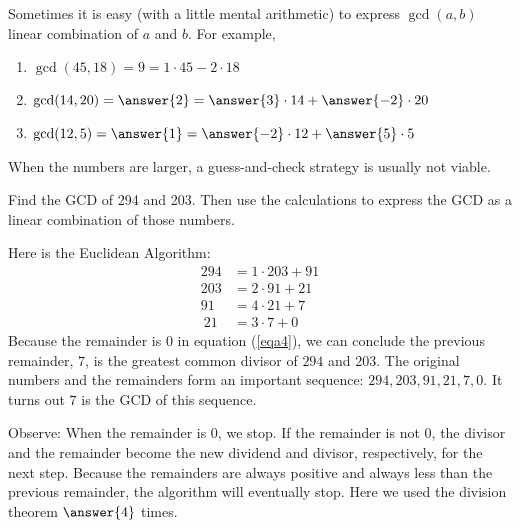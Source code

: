 \documentclass[space,nooutcomes]{ximera}
\begin{document}
\begin{problem}
Sometimes it is easy (with a little mental arithmetic) to express $\gcd(a,b)$ linear combination of $a$ and $b$.  For example, 
\begin{enumerate}
\item $\gcd(45,18) = 9 = 1\cdot 45 - 2\cdot 18$
\item $\gcd(14,20) = \answer{2} = \answer{3} \cdot 14 + \answer{-2} \cdot 20$
\item $\gcd(12,5) = \answer{1} = \answer{-2} \cdot 12 + \answer{5} \cdot 5$
\end{enumerate}
When the numbers are larger, a guess-and-check strategy is usually not viable.  
\end{problem}

\begin{example}
Find the GCD of 294 and 203.  Then use the calculations to express the GCD as a linear combination of those numbers.  

\begin{solution}
Here is the Euclidean Algorithm:  
\begin{align}
\label{eqa1} 294 & = 1\cdot 203 + 91 \\  
\label{eqa2} 203 &= 2\cdot 91 + 21 \\
\label{eqa3}  91  &= 4\cdot 21 + 7 \\\
\label{eqa4}  21  &= 3\cdot 7 + 0
\end{align}
Because the remainder is 0 in equation (\ref{eqa4}), we can conclude the previous remainder, $7$, is the greatest common divisor of $294$ and $203$.  The original numbers and the remainders form an important sequence: $294, 203, 91, 21, 7, 0$.  It turns out $7$ is the GCD of this sequence.  

Observe:  When the remainder is 0, we stop.  If the remainder is not 0, the divisor and the remainder become the new dividend and divisor, respectively, for the next step.  Because the remainders are always positive and always less than the previous remainder, the algorithm will eventually stop.  Here we used the division theorem $\answer{4}$ times.  


\end{solution}
\end{example}
\end{document}
